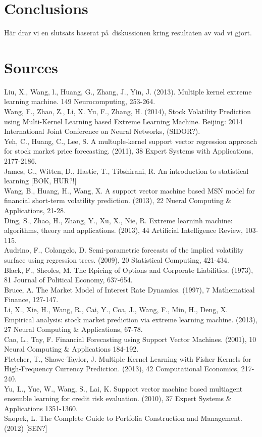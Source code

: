 \documentclass{article}
\begin{document}
\section{Conclusions}
H\"ar drar vi en slutsats baserat p\aa\ diskussionen kring resultaten av vad vi gjort.

\section{Sources}
Liu, X., Wang, l., Huang, G., Zhang, J., Yin, J. (2013). Multiple kernel extreme learning machine. 149 Neurocomputing, 253-264. \\
Wang, F., Zhao, Z., Li, X. Yu, F., Zhang, H. (2014), Stock Volatility Prediction using Multi-Kernel Learning based Extreme Learning Machine. Beijing: 2014 International Joint Conference on Neural Networks, (SIDOR?). \\
Yeh, C., Huang, C., Lee, S. A multuple-kernel support vector regression approach for stock market price forecasting. (2011), 38 Expert Systems with Applications, 2177-2186. \\
James, G., Witten, D., Hastie, T., Tibshirani, R. An introduction to statistical learning [BOK, HUR?!] \\
Wang, B., Huang, H., Wang, X. A support vector machine based MSN model for financial short-term volatility prediction. (2013), 22 Nueral Computing \& Applications, 21-28. \\
Ding, S., Zhao, H., Zhang, Y., Xu, X., Nie, R. Extreme learninh machine: algorithms, theory and applications. (2013), 44 Artificial Intelligence Review, 103-115. \\
Audrino, F., Colangelo, D. Semi-parametric forecasts of the implied volatility surface using regression trees. (2009), 20 Statistical Computing, 421-434. \\
Black, F., Shcoles, M. The Rpicing of Options and Corporate Liabilities. (1973), 81 Journal of Political Economy, 637-654. \\
Bruce, A. The Market Model of Interest Rate Dynamics. (1997), 7 Mathematical Finance, 127-147. \\
Li, X., Xie, H., Wang, R., Cai, Y., Coa, J., Wang, F., Min, H., Deng, X. Empirical analysis: stock market prediction via extreme learning machine. (2013), 27 Neural Computing \& Applications, 67-78. \\
Cao, L., Tay, F. Financial Forecasting using Support Vector Machines. (2001), 10 Neural Computing \& Applications 184-192. \\
Fletcher, T., Shawe-Taylor, J. Multiple Kernel Learning with Fisher Kernels for High-Frequency Currency Prediction. (2013), 42 Computational Economics, 217-240. \\
Yu, L., Yue, W., Wang, S., Lai, K. Support vector machine based multiagent ensemble learning for credit risk evaluation. (2010), 37 Expert Systems \& Applications 1351-1360. \\
Snopek, L. The Complete Guide to Portfolia Construction and Management. (2012) [SEN?] \\
\end{document}
